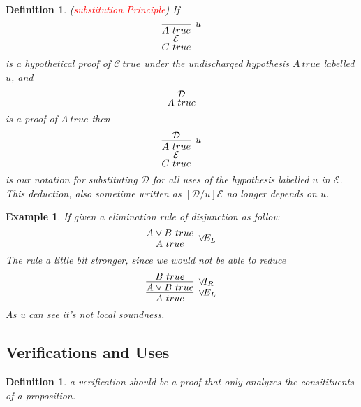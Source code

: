 \documentclass{article}
\theoremstyle{plain}
\newtheorem{example}[theorem]{Example}
\newtheorem{definition}[theorem]{Definition}
\theoremstyle{nonumberplain}
\newcommand{\redt}[1]{\textcolor{red}{#1}}
\begin{document}
\begin{definition}\label{substitution-in-ND}
\rm (\redt{substitution Principle}) If 
$$
\deduce[\mathcal{E}]{C~true}{\infer[u]{A~true}{}}
$$
is a hypothetical proof of $\mathcal{C}~true$ under the undischarged hypothesis $A~true$ labelled $u$, and 
$$
\deduce{A~true}{\mathcal{D}}
$$
is a proof of $A~true$ then
$$
\deduce[\mathcal{E}]{C~true}{\infer[u]{A~true}{\mathcal{D}}}
$$
is our notation for substituting $\mathcal{D}$ for all uses of the hypothesis labelled $u$ in $\mathcal{E}$. This deduction, also sometime written as $[\mathcal{D}/u]\mathcal{E}$ no longer depends on $u$.  
\end{definition}


\begin{example}
\rm If given a elimination rule of disjunction as follow
$$
\infer[\vee\!E_L]{A~true}{A \vee B~true}
$$
The rule a little bit stronger, since we would not be able to reduce
$$
\infer[\vee\!E_L]{A~true}{\infer[\vee\!I_R]{A \vee B~true}{B~true}}
$$
As u can see it's not local soundness. 
\end{example}







\newpage
\subsection{Verifications and Uses}

\begin{definition}
\rm a verification should be a proof that only analyzes the consitituents of a proposition.
\end{definition}
\end{document}
